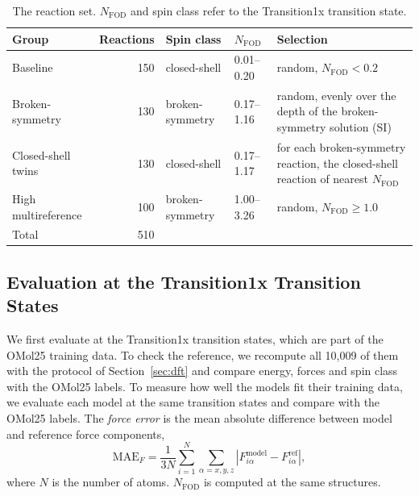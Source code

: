 \begin{table}
  \caption{The reaction set. $N_\mathrm{FOD}$ and spin class refer to the Transition1x transition state.}
  \label{tbl:set}
  \begin{tabular}{lrllp{5.2cm}}
    \hline
    Group & Reactions & Spin class & $N_\mathrm{FOD}$ & Selection \\
    \hline
    Baseline            & 150 & closed-shell    & 0.01--0.20 & random, $N_\mathrm{FOD} < 0.2$ \\
    Broken-symmetry     & 130 & broken-symmetry & 0.17--1.16 & random, evenly over the depth of the broken-symmetry solution (SI) \\
    Closed-shell twins  & 130 & closed-shell    & 0.17--1.17 & for each broken-symmetry reaction, the closed-shell reaction of nearest $N_\mathrm{FOD}$ \\
    High multireference & 100 & broken-symmetry & 1.00--3.26 & random, $N_\mathrm{FOD} \geq 1.0$ \\
    \hline
    Total               & 510 &                 &            & \\
    \hline
  \end{tabular}
\end{table}

\subsection{Evaluation at the Transition1x Transition States}
\label{sec:evalt1x}
We first evaluate at the Transition1x transition states, which are part of the OMol25 training data. To check the reference, we recompute all 10,009 of them with the protocol of Section~\ref{sec:dft} and compare energy, forces and spin class with the OMol25 labels. To measure how well the models fit their training data, we evaluate each model at the same transition states and compare with the OMol25 labels. The \emph{force error} is the mean absolute difference between model and reference force components,
\begin{equation}
  \mathrm{MAE}_F = \frac{1}{3N}\sum_{i=1}^{N}\sum_{\alpha=x,y,z} \left| F^\mathrm{model}_{i\alpha} - F^\mathrm{ref}_{i\alpha} \right|,
\end{equation}
where $N$ is the number of atoms. $N_\mathrm{FOD}$ is computed at the same structures.

